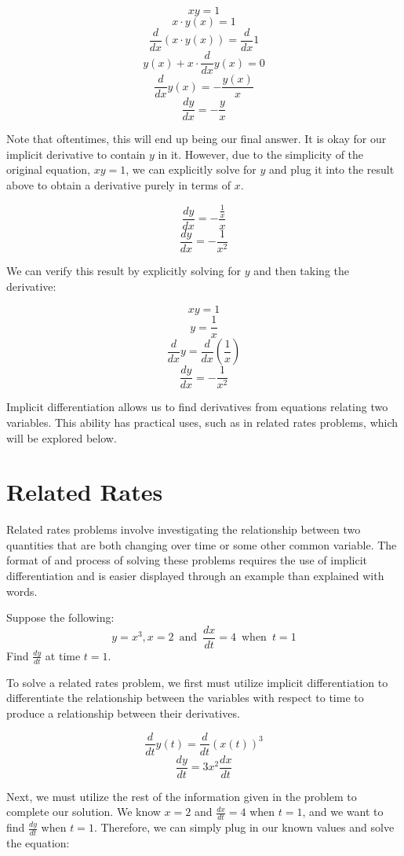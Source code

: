 \documentclass[11pt]{article}
\begin{document}
\[ xy = 1 \]
\[ x \cdot y(x) = 1 \]
\[ \frac{d}{dx} (x \cdot y(x)) = \frac{d}{dx}1 \]
\[ y(x) + x \cdot \frac{d}{dx}y(x) = 0 \]
\[ \frac{d}{dx}y(x) = -\frac{y(x)}{x} \]
\[ \frac{dy}{dx} = -\frac{y}{x} \]

Note that oftentimes, this will end up being our final answer. It is okay for our implicit derivative to contain $y$ in it. However, due to the simplicity of the original equation, $xy = 1$, we can explicitly solve for $y$ and plug it into the result above to obtain a derivative purely in terms of $x$.

\[ \frac{dy}{dx} = -\frac{\frac{1}{x}}{x} \]
\[ \frac{dy}{dx} = -\frac{1}{x^2} \]

We can verify this result by explicitly solving for $y$ and then taking the derivative:

\[ xy = 1 \]
\[ y = \frac{1}{x}\]
\[ \frac{d}{dx}y = \frac{d}{dx}(\frac{1}{x})\]
\[ \frac{dy}{dx} = -\frac{1}{x^2}\]

Implicit differentiation allows us to find derivatives from equations relating two variables. This ability has practical uses, such as in related rates problems, which will be explored below.

\section{Related Rates}
Related rates problems involve investigating the relationship between two quantities that are both changing over time or some other common variable. The format of and process of solving these problems requires the use of implicit differentiation and is easier displayed through an example than explained with words. 

\vspace{5}
Suppose the following:
\[  y=x^3, x=2 \enspace \textrm{and} \enspace \frac{dx}{dt}=4 \enspace \textrm{when} \enspace t=1\]
Find $\frac{dy}{dt}$ at time $t=1$. 
\vspace{5}

To solve a related rates problem, we first must utilize implicit differentiation to differentiate the relationship between the variables with respect to time to produce a relationship between their derivatives. 

\[  \frac{d}{dt}y(t) = \frac{d}{dt}(x(t))^3 \]
\[  \frac{dy}{dt} = 3x^2\frac{dx}{dt} \]

Next, we must utilize the rest of the information given in the problem to complete our solution. We know $x=2$ and $\frac{dx}{dt}=4$ when $t=1$, and we want to find $\frac{dy}{dt}$ when $t=1$. Therefore, we can simply plug in our known values and solve the equation:
\end{document}

